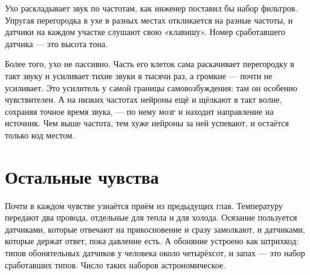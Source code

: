 Ухо раскладывает звук по частотам, как инженер поставил бы набор фильтров. Упругая перегородка в ухе в разных местах откликается на разные частоты, и датчики на каждом участке слушают свою «клавишу». Номер сработавшего датчика --- это высота тона.


Более того, ухо не пассивно. Часть его клеток сама раскачивает перегородку в такт звуку и усиливает тихие звуки в тысячи раз, а громкие --- почти не усиливает. Это усилитель у самой границы самовозбуждения: там он особенно чувствителен. А на низких частотах нейроны ещё и щёлкают в такт волне, сохраняя точное время звука, --- по нему мозг и находит направление на источник. Чем выше частота, тем хуже нейроны за ней успевают, и остаётся только код местом.

\section*{Остальные чувства}

Почти в каждом чувстве узнаётся приём из предыдущих глав. Температуру передают два провода, отдельные для тепла и для холода. Осязание пользуется датчиками, которые отвечают на прикосновение и сразу замолкают, и датчиками, которые держат ответ, пока давление есть. А обоняние устроено как штрихкод: типов обонятельных датчиков у человека около четырёхсот, и запах --- это набор сработавших типов. Число таких наборов астрономическое.

